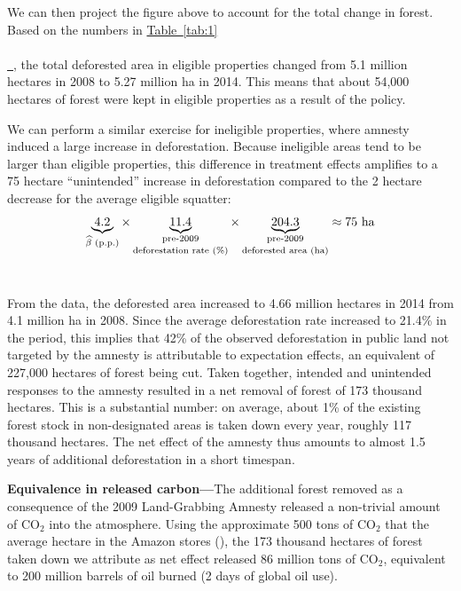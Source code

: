\documentclass[12pt]{article}
\newcommand*{\tabref}[2][]{%
  \hyperref[{tab:#2}]{%
    Table~\ref*{tab:#2}%
    \ifx\\#1\\%
    \else
      \,#1%
    \fi
  }%
}
\begin{document}
\quad We can then project the figure above to account for the total change in forest. Based on the numbers in \tabref{1}, the total deforested area in eligible properties changed from 5.1 million hectares in 2008 to 5.27 million ha in 2014. This means that about 54,000 hectares of forest were kept in eligible properties as a result of the policy. 
\ 

\quad We can perform a similar exercise for ineligible properties, where amnesty induced a large increase in deforestation. Because ineligible areas tend to be larger than eligible properties, this difference in treatment effects amplifies to a 75 hectare ``unintended'' increase in deforestation compared to the 2 hectare decrease for the average eligible squatter: 
\begin{equation*}
    \underbrace{4.2}_{\widehat{\beta} \text{ (p.p.)}}
    \times
    \underbrace{11.4}_{\shortstack{\scriptsize\text{pre-2009} \\ \scriptsize\text{deforestation rate (\%)}}}
    \times
    \underbrace{204.3}_{\shortstack{\scriptsize\text{pre-2009} \\ \scriptsize\text{deforested area (ha)}}}\approx75\text{ ha}
\end{equation*}
\

\quad  From the data, the deforested area increased to 4.66 million hectares in 2014 from 4.1 million ha in 2008. Since the average deforestation rate increased to 21.4\% in the period, this implies that 42\% of the observed deforestation in public land not targeted by the amnesty is attributable to expectation effects, an equivalent of 227,000 hectares of forest being cut. Taken together, intended and unintended responses to the amnesty resulted in a net removal of forest of 173 thousand hectares. This is a substantial number: on average, about 1\% of the existing forest stock in non-designated areas is taken down every year, roughly 117 thousand hectares. The net effect of the amnesty thus amounts to almost 1.5 years of additional deforestation in a short timespan. 
\ 

\quad \textbf{Equivalence in released carbon---}The additional forest removed as a consequence of the 2009 Land-Grabbing Amnesty released a non-trivial amount of CO$_2$ into the atmosphere. Using the approximate 500 tons of CO$_2$ that the average hectare in the Amazon stores (\citet{scheinkman2024carbon}), the 173 thousand hectares of forest taken down we attribute as net effect released 86 million tons of CO$_2$, equivalent to 200 million barrels of oil burned (2 days of global oil use). 
\end{document}
